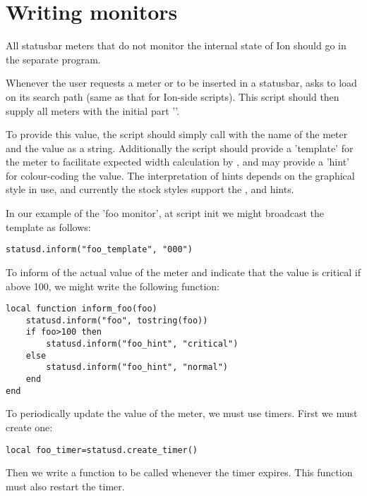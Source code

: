
\section{Writing  monitors}
\label{sec:statusd}

All statusbar meters that do not monitor the internal state of Ion should
go in the separate  program. 

Whenever the user requests a meter  or  to be 
inserted in a statusbar,  asks  to
load  on its search path (same as that for Ion-side 
scripts). This script should then supply all meters with the initial part
''.

To provide this value, the script should simply call 
with the name of the meter and the value as a string.
Additionally the script should provide a 'template' for the meter to
facilitate expected width calculation by , and
may provide a 'hint' for colour-coding the value. The interpretation
of hints depends on the graphical style in use, and currently the
stock styles support the ,  and 
 hints.


In our example of the 'foo monitor', at script init we might broadcast
the template as follows:

\begin{verbatim}
statusd.inform("foo_template", "000")
\end{verbatim}

To inform  of the actual value of the meter and
indicate that the value is critical if above 100, we might write the
following function:

\begin{verbatim}
local function inform_foo(foo)
    statusd.inform("foo", tostring(foo))
    if foo>100 then
        statusd.inform("foo_hint", "critical")
    else
        statusd.inform("foo_hint", "normal")
    end
end    
\end{verbatim}
    
To periodically update the value of the meter, we must use timers.
First we must create one:

\begin{verbatim}
local foo_timer=statusd.create_timer()
\end{verbatim}

Then we write a function to be called whenever the timer expires.
This function must also restart the timer.

